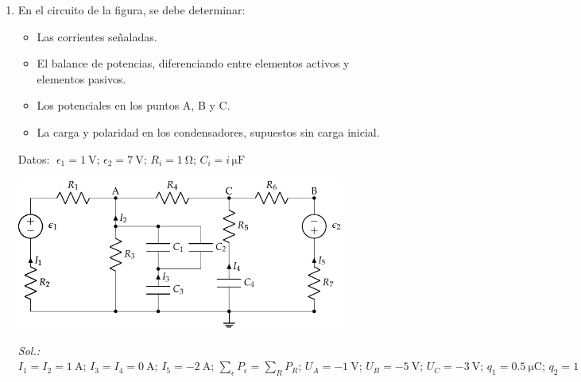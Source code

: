 \begin{enumerate}
\newpage

\item En el circuito de la figura, se debe determinar:
  \begin{itemize}
  \item Las corrientes señaladas.
  \item El balance de potencias, diferenciando entre elementos activos
    y elementos pasivos.
  \item Los potenciales en los puntos A, B y C.
  \item La carga y polaridad en los condensadores, supuestos sin carga
    inicial.
  \end{itemize}
  Datos:
  $\; \epsilon_1 =\qty{1}{\volt};\, \epsilon_2 =\qty{7}{\volt};\, R_i = \qty{1}{\ohm};\, C_i = i\, \si{\micro \farad}$

  \begin{center}
    \includegraphics[height=5cm]{../figs/mallas_agrupacion_condensadores.pdf}
  \end{center}

  \emph{Sol.:\;
    $I_1=I_2=\qty{1}{\ampere};\, I_3=I_4=\qty{0}{\ampere};\, I_5=\qty{-2}{\ampere};\, \sum_\epsilon P_\epsilon = \sum_R P_R;\, U_A=\qty{-1}{\volt};\, U_B=\qty{-5}{\volt};\, U_C=\qty{-3}{\volt};\, q_1=\qty{0.5}{\micro\coulomb};\, q_2 = \qty{1}{\micro\coulomb};\, q_3=\qty{1.5}{\micro\coulomb};\, q_4=\qty{12}{\micro\coulomb}$}


\end{enumerate}
